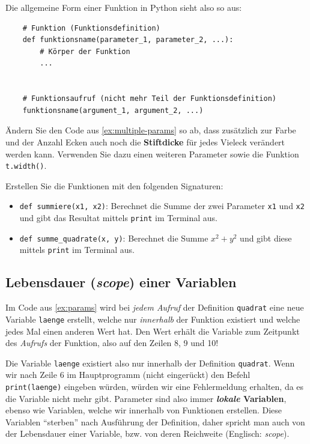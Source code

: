 \begin{myoverview}
	\medskip
	Die allgemeine Form einer Funktion in Python sieht also so aus:
	\begin{lstlisting}
	# Funktion (Funktionsdefinition)
	def funktionsname(parameter_1, parameter_2, ...):
		# Körper der Funktion
		...
	

	# Funktionsaufruf (nicht mehr Teil der Funktionsdefinition)
	funktionsname(argument_1, argument_2, ...)
	\end{lstlisting}
\end{myoverview}

\begin{myexercise}
	Ändern Sie den Code aus \cref{ex:multiple-params} so ab, dass zusätzlich zur Farbe und der Anzahl Ecken auch noch die \textbf{Stiftdicke} für jedes Vieleck verändert werden kann. Verwenden Sie dazu einen weiteren Parameter sowie die Funktion \lstinline|t.width()|.
\end{myexercise}

\begin{myexercise}
	Erstellen Sie die Funktionen mit den folgenden Signaturen:
	\begin{itemize}
		\item \lstinline|def summiere(x1, x2)|: Berechnet die Summe der zwei Parameter \lstinline|x1| und \lstinline|x2| und gibt das Resultat mittels \lstinline|print| im Terminal aus.
		\item \lstinline|def summe_quadrate(x, y)|: Berechnet die Summe \(x^2 + y^2\) und gibt diese mittels \lstinline{print} im Terminal aus.
	\end{itemize}
\end{myexercise}

\subsection{Lebensdauer (\textit{scope}) einer Variablen}
Im Code aus \cref{ex:params} wird bei \textit{jedem Aufruf} der Definition \lstinline|quadrat| eine neue Variable \texttt{laenge} erstellt, welche nur \textit{innerhalb} der Funktion existiert und welche jedes Mal einen anderen Wert hat. Den Wert erhält die Variable zum Zeitpunkt des \textit{Aufrufs} der Funktion, also auf den Zeilen 8, 9 und 10!

Die Variable \lstinline|laenge| existiert also nur innerhalb der Definition \lstinline|quadrat|. Wenn wir nach Zeile 6 im Hauptprogramm (nicht eingerückt) den Befehl \lstinline|print(laenge)| eingeben würden, würden wir eine Fehlermeldung erhalten, da es die Variable nicht mehr gibt. Parameter sind also immer \textbf{\textit{lokale} Variablen}, ebenso wie Variablen, welche wir innerhalb von Funktionen erstellen. Diese Variablen \enquote{sterben} nach Ausführung der Definition, daher spricht man auch von der Lebensdauer einer Variable, bzw. von deren Reichweite (Englisch: \textit{scope}).

